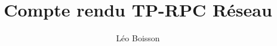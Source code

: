 \documentclass[10pt,a4paper,final]{article}
\author{Léo Boisson}
\title{\textbf{Compte rendu TP-RPC Réseau}}
\begin{document}
\date{}
\maketitle  
\tableofcontents  
\newpage
\end{document}

